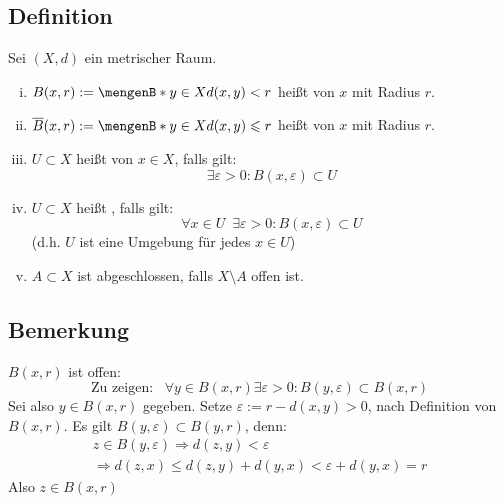 \subsection[Definition Kugel, Umgebung]{Definition} %
\label{sub:23}
Sei $(X,d)$ ein metrischer Raum.
\begin{enumerate}[(i)]
	\item $B(x,r) := \set[y \in X]{d(x,y) < r} $ heißt  von $x$ mit Radius $r$.
	\item $\overline{B}(x,r) := \set[y \in X]{d(x,y) \le r} $ heißt  von $x$ mit Radius $r$.  
	\item $U \subset X$ heißt   von $x \in X$, falls gilt:
	\[
		\exists \varepsilon > 0 : B(x,\varepsilon) \subset U
	\] 
	\item $U \subset X$ heißt , falls gilt:
	\[
		\forall x \in U \enspace \exists \varepsilon >0 : B(x,\varepsilon) \subset U
	\] 
	(d.h. $U$ ist eine Umgebung für jedes $x \in U$)
	\item $A \subset X$ ist abgeschlossen, falls $X \setminus A$ offen ist.
\end{enumerate}

\subsection[Bemerkung über in Kugeln enthaltene Kugeln]{Bemerkung} %
\label{sub:24}
$B(x,r)$ ist offen:
\[
	\text{Zu zeigen: } \enspace \forall y \in B(x,r) \exists \varepsilon > 0 : B(y,\varepsilon) \subset B(x,r)
\]
Sei also $y \in B(x,r)$ gegeben. Setze $\varepsilon := r- d(x,y) > 0$, nach Definition von $B(x,r)$. Es gilt $B(y,\varepsilon) \subset B(y,r)$, denn:
\begin{gather*}
	z \in B(y,\varepsilon) \Rightarrow d(z,y) < \varepsilon \\
	\Rightarrow  d(z,x) \le d(z,y) + d(y,x) < \varepsilon + d(y,x) = r 
\end{gather*}
Also $z\in B(x,r)$ \bewende
\begin{figure}[ht]
\end{figure}

